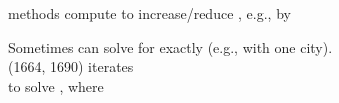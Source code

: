 \documentclass{article}
\begin{document}
\begin{huge}
 methods compute 
\mat{\[
 \nabla f=\left(
  \frac{\partial f}{\partial x_1},\frac{\partial f}{\partial y_1},
  \frac{\partial f}{\partial x_2},\frac{\partial f}{\partial y_2},
  \frac{\partial f}{\partial x_3},\frac{\partial f}{\partial y_3}
 \right)
\]}
to increase/reduce , e.g., by 

Sometimes can solve for  exactly (e.g., with one city).\\
 (1664, 1690) iterates 
\\
to solve , where 

\end{huge}
\end{document}
